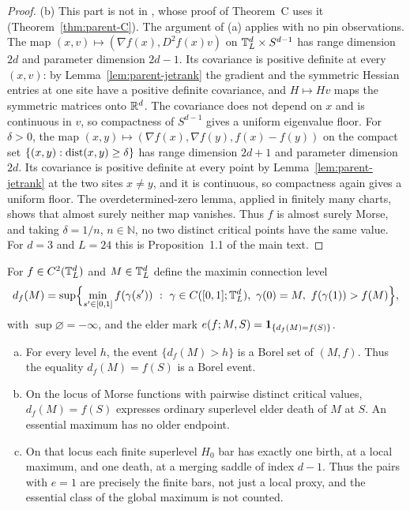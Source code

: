 \begin{proof}
(b) This part is not in \cite{parentP}, whose proof of Theorem~C uses it (Theorem~\ref{thm:parent-C}). The argument of (a) applies with no pin observations. The map $(x,v)\mapsto(\nabla f(x),D^2f(x)v)$ on $\mathbb T^d_L\times S^{d-1}$ has range dimension $2d$ and parameter dimension $2d-1$. Its covariance is positive definite at every $(x,v)$: by Lemma~\ref{lem:parent-jetrank} the gradient and the symmetric Hessian entries at one site have a positive definite covariance, and $H\mapsto Hv$ maps the symmetric matrices onto $\mathbb R^d$. The covariance does not depend on $x$ and is continuous in $v$, so compactness of $S^{d-1}$ gives a uniform eigenvalue floor. For $\delta>0$, the map $(x,y)\mapsto(\nabla f(x),\nabla f(y),f(x)-f(y))$ on the compact set $\{(x,y):\operatorname{dist}(x,y)\ge\delta\}$ has range dimension $2d+1$ and parameter dimension $2d$. Its covariance is positive definite at every point by Lemma~\ref{lem:parent-jetrank} at the two sites $x\ne y$, and it is continuous, so compactness again gives a uniform floor. The overdetermined-zero lemma, applied in finitely many charts, shows that almost surely neither map vanishes. Thus $f$ is almost surely Morse, and taking $\delta=1/n$, $n\in\mathbb N$, no two distinct critical points have the same value. For $d=3$ and $L=24$ this is Proposition~1.1 of the main text.
\end{proof}

\begin{lemma}\label{lem:parent-mark}
For $f\in C^2(\mathbb T^d_L)$ and $M\in\mathbb T^d_L$ define the maximin connection level
\begin{equation}\label{eq:parent-df}
d_f(M)=\sup\Bigl\{\min_{s'\in[0,1]}f(\gamma(s'))\ :\ \gamma\in C([0,1];\mathbb T^d_L),\ \gamma(0)=M,\ f(\gamma(1))>f(M)\Bigr\},
\end{equation}
with $\sup\varnothing=-\infty$, and the elder mark $e(f;M,S)=\mathbf 1_{\{d_f(M)=f(S)\}}$.
\begin{enumerate}[(a),leftmargin=2em]
\item For every level $h$, the event $\{d_f(M)>h\}$ is a Borel set of $(M,f)$. Thus the equality $d_f(M)=f(S)$ is a Borel event.
\item On the locus of Morse functions with pairwise distinct critical values, $d_f(M)=f(S)$ expresses ordinary superlevel elder death of $M$ at $S$. An essential maximum has no older endpoint.
\item On that locus each finite superlevel $H_0$ bar has exactly one birth, at a local maximum, and one death, at a merging saddle of index $d-1$. Thus the pairs with $e=1$ are precisely the finite bars, not just a local proxy, and the essential class of the global maximum is not counted.
\end{enumerate}
\end{lemma}


